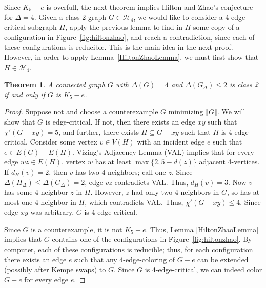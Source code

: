\documentclass[12pt]{article}
\theoremstyle{plain}
\newtheorem{thm}{Theorem}[section]
\theoremstyle{definition}
\theoremstyle{remark}
\newcommand{\fancy}[1]{\mathcal{#1}}
\newcommand{\size}[1]{\left\Vert#1\right\Vert}
\def\H{\fancy{H}}
\begin{document}
Since $K_5 - e$ is overfull, the next theorem implies Hilton and Zhao's conjecture
for $\Delta=4$.  Given a class 2 graph $G\in \H_4$, we would like to consider a
4-edge-critical subgraph $H$, apply the previous lemma to find in $H$ some copy of a
configuration in Figure~\ref{fig:hiltonzhao}, and reach a contradiction, since
each of these configurations is reducible.  This is the main idea in the next
proof.  However, in order to apply Lemma~\ref{HiltonZhaoLemma}, we must first
show that $H\in \H_4$.

\begin{thm}
A connected graph $G$ with $\Delta(G) = 4$ and $\Delta(G_\Delta) \le 2$ is
class 2 if and only if $G$ is $K_5-e$.
\end{thm}
\begin{proof}
Suppose not and choose a counterexample $G$ minimizing $\size{G}$.  We will show
that $G$ is edge-critical.  If not, then there exists an edge $xy$ such that
$\chi'(G-xy)=5$, and further, there exists $H\subseteq G-xy$ such that $H$ is
4-edge-critical.  Consider some vertex $v\in V(H)$ with an incident edge $e$ such
that $e\in E(G)-E(H)$.  Vizing's Adjacency Lemma (VAL) implies that for every
edge $wz\in E(H)$, vertex $w$ has at least $\max\{2,5-d(z)\}$ adjacent 4-vertices.
If $d_H(v)=2$, then $v$ has two 4-neighbors; call one $z$. Since
$\Delta(H_{\Delta})\le \Delta(G_{\Delta})=2$, edge $vz$ contradicts VAL.  Thus,
$d_H(v)=3$.  Now $v$ has some 4-neighbor $z$ in $H$.  However, $z$ had only two
4-neighbors in $G$, so has at most one 4-neighbor in $H$, which contradicts VAL.
Thus, $\chi'(G-xy)\le 4$.  Since edge $xy$ was arbitrary, $G$ is 4-edge-critical.


Since $G$ is a counterexample, it is not $K_5-e$.  
Thus, Lemma \ref{HiltonZhaoLemma} implies that $G$ contains one of the 
configurations in Figure~\ref{fig:hiltonzhao}.  
By computer, each of these configurations %
is reducible; thus, for each configuration there exists an edge $e$ such that
any 4-edge-coloring of $G-e$ can be extended (possibly after Kempe swaps) to
$G$.  Since $G$ is 4-edge-critical, we can indeed color $G-e$ for every edge $e$.
\end{proof}
\end{document}
